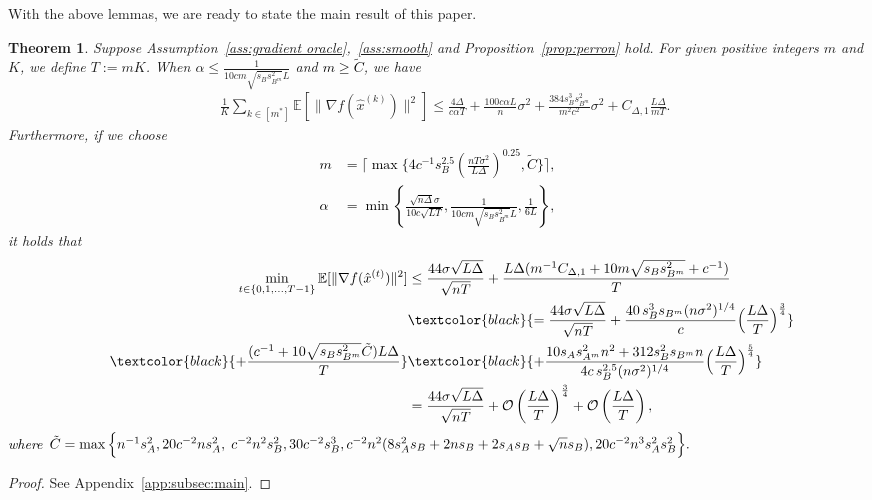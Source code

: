 \documentclass[10pt]{article}
\newcommand{\cO}{{\mathcal{O}}}
\newcommand{\EE}{\mathbb{E}}
\newcommand{\norm}[1]{\| #1 \|}
\newcommand{\gan}[1]{\textcolor{gan}{[#1]}}
\newcommand{\revision}[1]{\textcolor{black}{#1}}
\newtheorem{theorem}[thm]{Theorem}
\begin{document}
With the above lemmas, we are ready to state the main result of this paper.
\begin{theorem}\label{thm:main}
     Suppose Assumption~\ref{ass:gradient oracle},~\ref{ass:smooth} and Proposition~\ref{prop:perron} hold. For given positive integers $m$ and $K$, we define $T:=mK$.  When $\alpha \le \frac{1}{10cm\sqrt{s_Bs_{B^m}^2}L}$ and \revision{$m\ge \tilde{C}$}, we have
    \begin{align}\label{ieq:thm:main-1}
        \quad\frac{1}{K}\sum_{k\in [m^*]}\EE[\norm{\nabla f(\hat{x}^{(k)})}^2]\le \frac{4\Delta}{c\alpha T}+\frac{100c\alpha L}{n}\sigma^2+\frac{384s_B^3s_{B^m}^2}{m^2c^2}\sigma^2 + C_{\Delta,1}\frac{L\Delta}{mT}.
    \end{align}
    Furthermore, if we choose 
\revision{
\begin{align}
    m&=\lceil \max\{4c^{-1} s_B^{2.5} \left(\frac{nT\sigma^2}{L\Delta}\right)^{0.25}, \tilde{C}\}  \rceil, \label{xbasbd-1}\\
    \alpha&=\min\left\{\frac{\sqrt{n\Delta}\sigma}{10c\sqrt{LT}}, \frac{1}{10cm\sqrt{s_Bs_{B^m}^2}L}, \frac{1}{6L}\right\}, \label{xbasbd-2}
\end{align}
}
it holds that 
\begin{align}\label{ieq:thm:main-2}
    \min_{t\in\{0,1,\ldots,T-1\}}\EE[\norm{\nabla f(\hat{x}^{(t)})}^2]
    &\le \frac{44\sigma\sqrt{L\Delta}}{\sqrt{nT}}
        +\frac{L\Delta (m^{-1}C_{\Delta,1}+10m\sqrt{s_Bs_{B^m}^2}+c^{-1}) }{T}\\
    &\revision{= \frac{44\sigma\sqrt{L\Delta}}{\sqrt{nT}}
        +\frac{40\,s_B^{3}s_{B^m}(n\sigma^2)^{1/4}}{c}\Big(\frac{L\Delta}{T}\Big)^{\frac34}}\nonumber
        \\\qquad \revision{ +\frac{(c^{-1}+10\sqrt{s_Bs_{B^m}^2}\Tilde{C})L\Delta}{T}}
        & \revision{+\frac{10s_As_{A^m}^2n^2+312s_B^2s_{B^m}n}{4c\,s_B^{2.5}(n\sigma^2)^{1/4}}\Big(\frac{L\Delta}{T}\Big)^{\frac54}}\nonumber\\
    &= \frac{44\sigma\sqrt{L\Delta}}{\sqrt{nT}}
        + \cO\left(\frac{L\Delta}{T}\right)^{\frac{3}{4}}
        + \cO\left(\frac{L\Delta}{T}\right)\nonumber,
\end{align}
\revision{where $\Tilde{C}= \max \Big\{ 
    n^{-1}s_A^2, 20c^{-2}ns_A^2,\;c^{-2}n^2s_B^2,  30c^{-2}s_B^3,
    c^{-2}n^2(8s_A^2s_B+2ns_B+2s_As_B\\+\sqrt{n}s_B), 20c^{-2}n^3s_A^2s_B^2
\Big\}.
$
}
\end{theorem}
\begin{proof}
    See Appendix~\ref{app:subsec:main}.
\end{proof}
\end{document}
